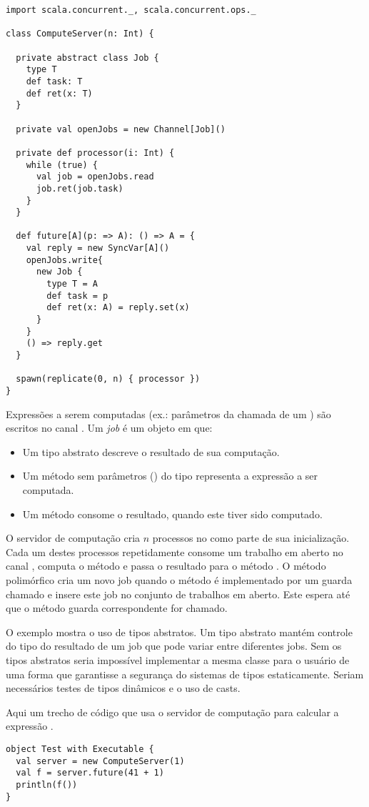\begin{lstlisting}
import scala.concurrent._, scala.concurrent.ops._

class ComputeServer(n: Int) {

  private abstract class Job {
    type T
    def task: T
    def ret(x: T)
  }

  private val openJobs = new Channel[Job]()

  private def processor(i: Int) {
    while (true) {
      val job = openJobs.read
      job.ret(job.task)
    }
  }

  def future[A](p: => A): () => A = {
    val reply = new SyncVar[A]()
    openJobs.write{
      new Job {
        type T = A
        def task = p
        def ret(x: A) = reply.set(x)
      }
    }
    () => reply.get
  }

  spawn(replicate(0, n) { processor })
}
\end{lstlisting}
Expressões a serem computadas (ex.: parâmetros da chamada de um ) são escritos no canal  
. Um {\em job} é um objeto em que:
\begin{itemize}
\item
Um tipo abstrato  descreve o resultado de sua computação.
\item
Um método sem parâmetros () do tipo  representa a expressão a ser computada.
\item
Um método  consome o resultado, quando este tiver sido computado.
\end{itemize}
O servidor de computação cria $n$ processos no  como parte de sua inicialização.  Cada um destes processos repetidamente consome um trabalho em aberto no canal , computa o método e passa o resultado para o método . 
O método polimórfico  cria um novo job quando o método  é implementado por um guarda chamado  e insere este job no conjunto de trabalhos em aberto. Este espera até que o método guarda 
 correspondente for chamado.

O exemplo mostra o uso de tipos abstratos. Um tipo abstrato
 mantém controle do tipo do resultado de um job que pode variar
entre diferentes jobs. Sem os tipos abstratos seria impossível implementar
a mesma classe para o usuário de uma forma que garantisse a segurança do sistemas de tipos estaticamente. Seriam necessários testes de tipos dinâmicos e o uso de casts.


Aqui um trecho de código que usa o servidor de computação para calcular
a expressão .
\begin{lstlisting}
object Test with Executable {
  val server = new ComputeServer(1)
  val f = server.future(41 + 1)
  println(f())
}
\end{lstlisting}

